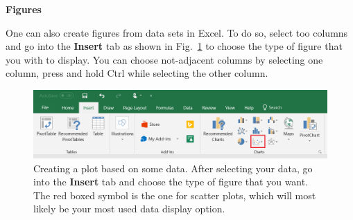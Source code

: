 \documentclass[12pt]{report}
\begin{document}
\noindent \large \textbf{Figures} \normalsize

One can also create figures from data sets in Excel. To do so, select too columns and go into the \textbf{Insert} tab as shown in Fig.~\ref{Fig:Excel-fig-insert} to choose the type of figure that you with to display. You can choose not-adjacent columns by selecting one column, press and hold Ctrl while selecting the other column.
\begin{figure}[h]
\centering
\includegraphics[width=0.8 \textwidth]{Excel-fig-insert}
\caption{Creating a plot based on some data. After selecting your data, go into the \textbf{Insert} tab and choose the type of figure that you want. The red boxed symbol is the one for scatter plots, which will most likely be your most used data display option.}
\label{Fig:Excel-fig-insert}
\end{figure}
\end{document}
